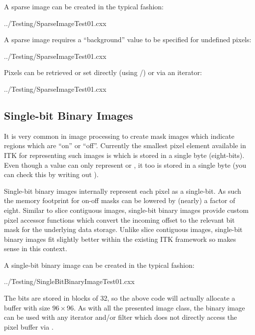 \documentclass{InsightArticle}
\begin{document}
A sparse image can be created in the typical fashion:
\listcpluspluspsnip

                 {../Testing/SparseImageTest01.cxx}

A sparse image requires a ``background'' value to be specified for
undefined pixels:
\listcpluspluspsnip

                 {../Testing/SparseImageTest01.cxx}

Pixels can be retrieved or set directly (using /)
or via an iterator:
\listcpluspluspsnip

                 {../Testing/SparseImageTest01.cxx}
\vspace{-10mm}
\subsection{Single-bit Binary Images}
It is very common in image processing to create mask images which
indicate regions which are ``on'' or ``off''.
Currently the smallest pixel element available in ITK for representing such
images is  which is stored in a single byte (eight-bits).
Even though a  value can only represent  or ,
it too is stored in a single byte (you can check this by writing out ).

Single-bit binary images internally represent each pixel as a single-bit.
As such the memory footprint for on-off masks can be lowered by (nearly) a factor of eight.
Similar to slice contiguous images, single-bit binary images provide custom pixel
accessor functions which convert the incoming offset to the relevant bit mask for the
underlying data storage.
Unlike slice contiguous images, single-bit binary images fit slightly better within the
existing ITK framework so  makes sense in this context.

A single-bit binary image can be created in the typical fashion:
\listcpluspluspsnip

                 {../Testing/SingleBitBinaryImageTest01.cxx}

The bits are stored in blocks of 32, so the above code will actually
allocate a buffer with size $96 \times 96$.
As with all the presented image class, the binary image can be used with
any iterator and/or filter
which does not directly access the pixel buffer via .
\end{document}
